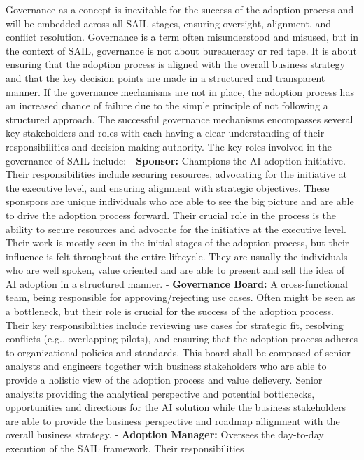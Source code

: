 \documentclass[]{imc-inf}
\begin{document}
Governance as a concept is inevitable for the success of the adoption
process and will be embedded across all SAIL stages, ensuring oversight,
alignment, and conflict resolution. Governance is a term often
misunderstood and misused, but in the context of SAIL, governance is not
about bureaucracy or red tape. It is about ensuring that the adoption
process is aligned with the overall business strategy and that the key
decision points are made in a structured and transparent manner. If the
governance mechanisms are not in place, the adoption process has an
increased chance of failure due to the simple principle of not following
a structured approach. The successful governance mechanisms encompasses
several key stakeholders and roles with each having a clear
understanding of their responsibilities and decision-making authority.
The key roles involved in the governance of SAIL include: -
\textbf{Sponsor:} Champions the AI adoption initiative. Their
responsibilities include securing resources, advocating for the
initiative at the executive level, and ensuring alignment with strategic
objectives. These sponspors are unique individuals who are able to see
the big picture and are able to drive the adoption process forward.
Their crucial role in the process is the ability to secure resources and
advocate for the initiative at the executive level. Their work is mostly
seen in the initial stages of the adoption process, but their influence
is felt throughout the entire lifecycle. They are usually the
individuals who are well spoken, value oriented and are able to present
and sell the idea of AI adoption in a structured manner. -
\textbf{Governance Board:} A cross-functional team, being responsible
for approving/rejecting use cases. Often might be seen as a bottleneck,
but their role is crucial for the success of the adoption process. Their
key responsibilities include reviewing use cases for strategic fit,
resolving conflicts (e.g., overlapping pilots), and ensuring that the
adoption process adheres to organizational policies and standards. This
board shall be composed of senior analysts and engineers together with
business stakeholders who are able to provide a holistic view of the
adoption process and value delievery. Senior analysits providing the
analytical perspective and potential bottlenecks, opportunities and
directions for the AI solution while the business stakeholders are able
to provide the business perspective and roadmap allignment with the
overall business strategy. - \textbf{Adoption Manager:} Oversees the
day-to-day execution of the SAIL framework. Their responsibilities
\end{document}
